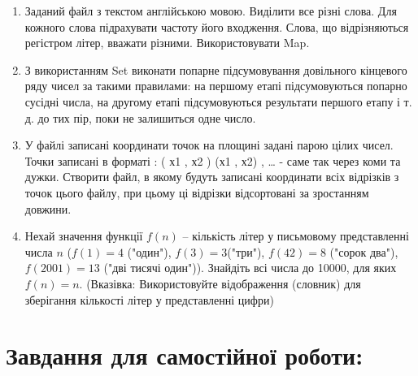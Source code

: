 \documentclass[a5paper,titlepage,openany,twoside,
]
{book_unv}%
\begin{document}
\begin{enumerate}
\def\labelenumi{\arabic{enumi})}
\item
  Заданий файл з текстом англійською мовою. Виділити все різні слова.
  Для кожного слова підрахувати частоту його входження. Слова, що
  відрізняються регістром літер, вважати різними. Використовувати Map.

\item
  З використанням Set виконати попарне підсумовування довільного
  кінцевого ряду чисел за такими правилами: на першому етапі
  підсумовуються попарно сусідні числа, на другому етапі підсумовуються
  результати першого етапу і т. д. до тих пір, поки не залишиться одне
  число.
\item
  У файлі записані координати точок на площині задані парою цілих чисел.
  Точки записані в форматі : ( х1 , х2 ) (х1 , х2) , \ldots{} - саме
  так через коми та дужки. Створити файл, в якому будуть записані
  координати всіх відрізків з точок цього файлу, при цьому ці відрізки
  відсортовані за зростанням довжини.

\item
  Нехай значення функції $f(n)$ -- кількість літер у письмовому
  представленні числа $n$ ($f(1)=4$ ("один"), $f(3)=3$("три"), $f(42)=8$
  ("сорок два"), $f(2001)=13$ ("дві тисячі один")). Знайдіть всі числа до
  10000, для яких $f(n) = n$. (Вказівка: Використовуйте
  відображення (словник) для зберігання кількості літер у представленні
  цифри)

\end{enumerate}

\section{Завдання для самостійної роботи:}
\end{document}
